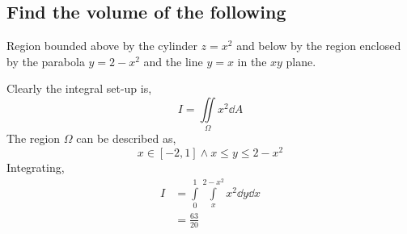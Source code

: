 \subsection{Find the volume of the following}
\begin{asign}
	Region bounded above by the cylinder $z=x^2$ and below by the region enclosed by the parabola $y=2-x^2$ and the line $y=x$ in the $xy$ plane.
\end{asign}
\begin{anse}
	Clearly the integral set-up is,
	\[I=\iint\limits_\Omega x^2\dd{A}\]
	The region $\Omega$ can be described as,
	\[x\in[-2,1]\land x\leq y\leq 2-x^2\]
	Integrating,
	\[\begin{split}
		I&=\int\limits_0^1\int\limits_x^{2-x^2} x^2\dd{y}\dd{x}\\
		&=\frac{63}{20}
	\end{split}\]
\end{anse}
